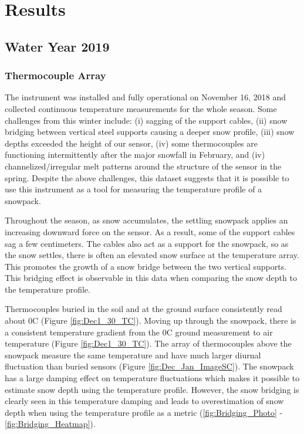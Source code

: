 \chapter{Results}
\section{Water Year 2019} 
\subsection{Thermocouple Array}
The instrument was installed and fully operational on November 16, 2018 and collected continuous temperature measurements for the whole season. Some challenges from this winter include: (i) sagging of the support cables, (ii) snow bridging between vertical steel supports causing a deeper snow profile, (iii) snow depths exceeded the height of our sensor, (iv) some thermocouples are functioning intermittently after the major snowfall in February, and (iv) channelized/irregular melt patterns around the structure of the sensor in the spring. Despite the above challenges, this dataset suggests that it is possible to use this instrument as a tool for measuring the temperature profile of a snowpack. 

Throughout the season, as snow accumulates, the settling snowpack applies an increasing downward force on the sensor. As a result, some of the support cables sag a few centimeters. The cables also act as a support for the snowpack, so as the snow settles, there is often an elevated snow surface at the temperature array. This promotes the growth of a snow bridge between the two vertical supports. This bridging effect is observable in this data when comparing the snow depth to the temperature profile.   

Thermocouples buried in the soil and at the ground surface consistently read about 0\textdegree C (Figure \ref{fig:Dec1_30_TC}). Moving up through the snowpack, there is a consistent temperature gradient from the 0\textdegree C ground measurement to air temperature (Figure \ref{fig:Dec1_30_TC}). The array of thermocouples above the snowpack measure the same temperature and have much larger diurnal fluctuation than buried sensors (Figure \ref{fig:Dec_Jan_ImageSC}). The snowpack has a large damping effect on temperature fluctuations which makes it possible to estimate snow depth using the temperature profile. However, the snow bridging is clearly seen in this temperature damping and leads to overestimation of snow depth when using the temperature profile as a metric (\ref{fig:Bridging_Photo} - \ref{fig:Bridging_Heatmap}). 

